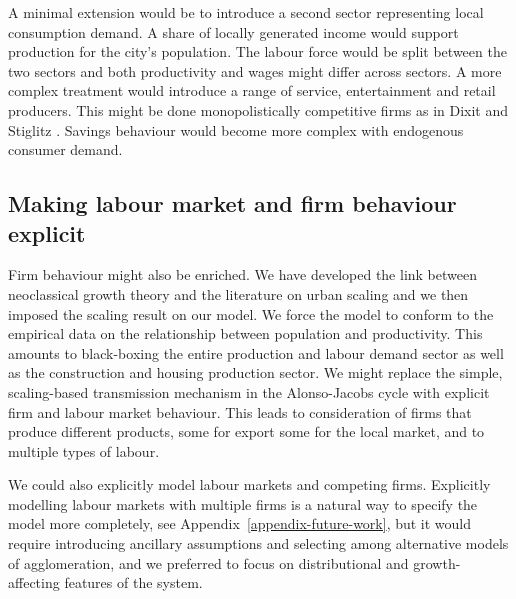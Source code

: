 A minimal extension would be to introduce a second sector representing local consumption demand. A share of locally generated income would support production for the city's population. The labour force would be split between the two sectors and both productivity and wages might differ across sectors. A more complex treatment would introduce a range of service, entertainment and retail producers. This might be done monopolistically competitive firms as in Dixit and Stiglitz \cite{AvinashK.Dixit1977MCaO}. Savings behaviour would become more complex with endogenous consumer demand. %


\subsection{Making labour market and firm behaviour explicit} 


Firm behaviour might also be enriched. We have  developed the link between neoclassical growth theory and the literature on urban scaling \cite{bettencourtIntroductionUrbanScience2021} and  we then imposed the scaling result on our model.  We force the model to conform to the empirical data on the relationship between population and productivity. This amounts to black-boxing the entire production and labour demand sector as well as the construction and housing production sector. 
We might replace the simple, scaling-based transmission mechanism in the Alonso-Jacobs cycle with explicit firm and labour market behaviour. %
This leads to consideration of firms that produce different products, some for export some for the local market, and to multiple types of labour.

We could also explicitly model labour markets and competing firms. Explicitly modelling labour markets with multiple firms is a natural way to specify the model more completely, see Appendix~\ref{appendix-future-work},  but it would require introducing ancillary assumptions and selecting among alternative models of agglomeration, and we preferred to focus on distributional and growth-affecting features of the system.

